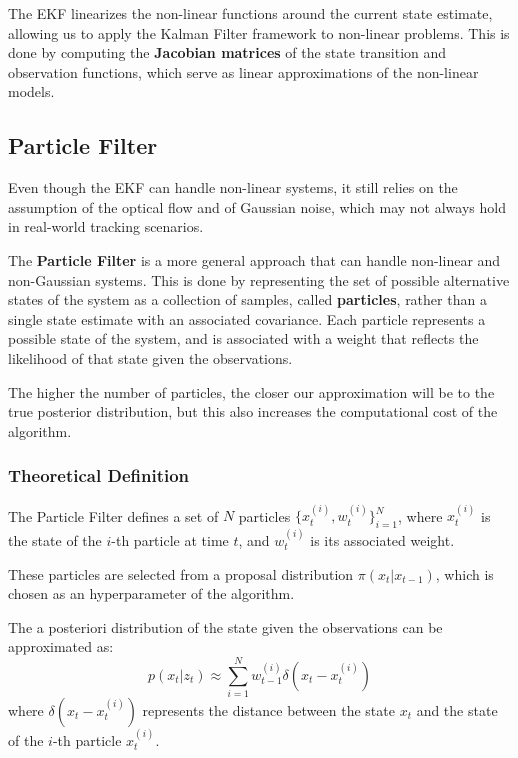 The EKF linearizes the non-linear functions around the current state estimate, allowing us to apply the Kalman Filter framework to non-linear problems.
This is done by computing the \textbf{Jacobian matrices} of the state transition and observation functions, which serve as linear approximations of the non-linear models.

\subsection{Particle Filter}
Even though the EKF can handle non-linear systems, it still relies on the assumption of the optical flow and of Gaussian noise, 
which may not always hold in real-world tracking scenarios.

The \textbf{Particle Filter} is a more general approach that can handle non-linear and non-Gaussian systems.
This is done by representing the set of possible alternative states of the system as a collection of samples, called \textbf{particles}, rather than a single state estimate with an associated covariance.
Each particle represents a possible state of the system, and is associated with a weight that reflects the
likelihood of that state given the observations.

The higher the number of particles, the closer our approximation will be to the true posterior distribution, but this also increases the computational cost of the algorithm.

\subsubsection{Theoretical Definition}
The Particle Filter defines a set of $N$ particles 
$\{x_t^{(i)}, w_t^{(i)}\}_{i=1}^N$, where $x_t^{(i)}$ is the state of the $i$-th particle at time $t$, 
and $w_t^{(i)}$ is its associated weight.

These particles are selected from a proposal distribution $\pi(x_t | x_{t-1})$, 
which is chosen as an hyperparameter of the algorithm.

The a posteriori distribution of the state given the observations can be approximated as:
$$p(x_t | z_{t}) \approx \sum_{i=1}^N w_{t-1}^{(i)} \delta(x_t - x_t^{(i)})$$
where $\delta(x_t - x_t^{(i)})$ represents the distance between the state $x_t$ and the state of the $i$-th particle $x_t^{(i)}$.

